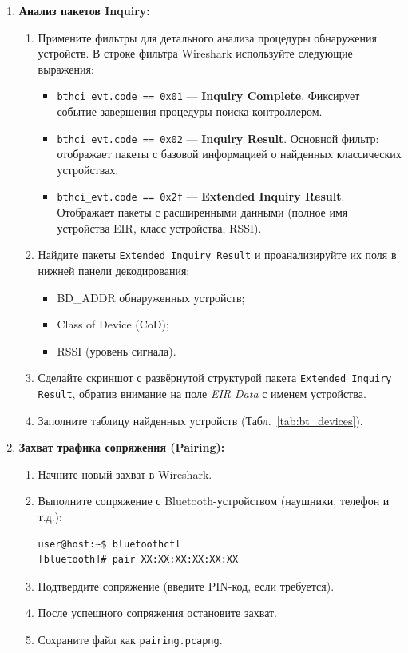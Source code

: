 \begin{enumerate}[nosep, leftmargin=*]
    \item \textbf{Анализ пакетов Inquiry:}
    \begin{enumerate}[label=\alph*), nosep]
        \item Примените фильтры для детального анализа процедуры обнаружения устройств. В строке фильтра Wireshark используйте следующие выражения:
        \begin{itemize}[nosep]
            \item \texttt{bthci\_evt.code == 0x01} — \textbf{Inquiry Complete}. Фиксирует событие завершения процедуры поиска контроллером.
            \item \texttt{bthci\_evt.code == 0x02} — \textbf{Inquiry Result}. Основной фильтр: отображает пакеты с базовой информацией о найденных классических устройствах.
            \item \texttt{bthci\_evt.code == 0x2f} — \textbf{Extended Inquiry Result}. Отображает пакеты с расширенными данными (полное имя устройства EIR, класс устройства, RSSI).
        \end{itemize}
        \item Найдите пакеты \texttt{Extended Inquiry Result} и проанализируйте их поля в нижней панели декодирования:
        \begin{itemize}[nosep]
            \item BD\_ADDR обнаруженных устройств;
            \item Class of Device (CoD);
            \item RSSI (уровень сигнала).
        \end{itemize}
        \item Сделайте скриншот с развёрнутой структурой пакета \texttt{Extended Inquiry Result}, обратив внимание на поле \textit{EIR Data} с именем устройства.
        \item Заполните таблицу найденных устройств (Табл.~\ref{tab:bt_devices}).
    \end{enumerate}

    \item \textbf{Захват трафика сопряжения (Pairing):}
    \begin{enumerate}[label=\alph*), nosep]
        \item Начните новый захват в Wireshark.
        \item Выполните сопряжение с Bluetooth-устройством (наушники, телефон и т.д.):
        \begin{lstlisting}
user@host:~$ bluetoothctl
[bluetooth]# pair XX:XX:XX:XX:XX:XX
        \end{lstlisting}
        \item Подтвердите сопряжение (введите PIN-код, если требуется).
        \item После успешного сопряжения остановите захват.
        \item Сохраните файл как \texttt{pairing.pcapng}.
    \end{enumerate}


\end{enumerate}
